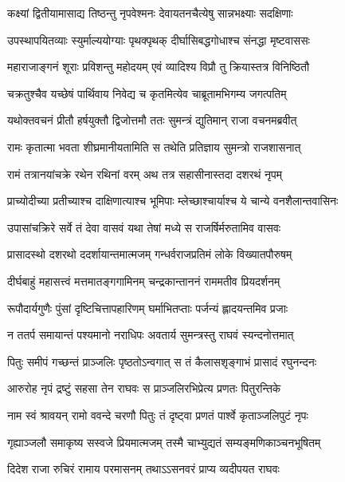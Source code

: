\twolineshloka
{कक्ष्यां द्वितीयामासाद्य तिष्ठन्तु नृपवेश्मनः}
{देवायतनचैत्येषु सान्नभक्ष्याः सदक्षिणाः} %

\twolineshloka
{उपस्थापयितव्याः स्युर्माल्ययोग्याः पृथक्पृथक्}
{दीर्घासिबद्धगोधाश्च संनद्धा मृष्टवाससः} %

\twolineshloka
{महाराजाङ्गनं शूराः प्रविशन्तु महोदयम्}
{एवं व्यादिश्य विप्रौ तु क्रियास्तत्र विनिष्ठितौ} %

\twolineshloka
{चक्रतुश्चैव यच्छेषं पार्थिवाय निवेद्य च}
{कृतमित्येव चाब्रूतामभिगम्य जगत्पतिम्} %

\twolineshloka
{यथोक्तवचनं प्रीतौ हर्षयुक्तौ द्विजोत्तमौ}
{ततः सुमन्त्रं द्युतिमान् राजा वचनमब्रवीत्} %

\twolineshloka
{रामः कृतात्मा भवता शीघ्रमानीयतामिति}
{स तथेति प्रतिज्ञाय सुमन्त्रो राजशासनात्} %

\twolineshloka
{रामं तत्रानयांचक्रे रथेन रथिनां वरम्}
{अथ तत्र सहासीनास्तदा दशरथं नृपम्} %

\twolineshloka
{प्राच्योदीच्या प्रतीच्याश्च दाक्षिणात्याश्च भूमिपाः}
{म्लेच्छाश्चार्याश्च ये चान्ये वनशैलान्तवासिनः} %

\twolineshloka
{उपासांचक्रिरे सर्वे तं देवा वासवं यथा}
{तेषां मध्ये स राजर्षिर्मरुतामिव वासवः} %

\twolineshloka
{प्रासादस्थो दशरथो ददर्शायान्तमात्मजम्}
{गन्धर्वराजप्रतिमं लोके विख्यातपौरुषम्} %

\twolineshloka
{दीर्घबाहुं महासत्त्वं मत्तमातङ्गगामिनम्}
{चन्द्रकान्ताननं राममतीव प्रियदर्शनम्} %

\twolineshloka
{रूपौदार्यगुणैः पुंसां दृष्टिचित्तापहारिणम्}
{घर्माभितप्ताः पर्जन्यं ह्लादयन्तमिव प्रजाः} %

\twolineshloka
{न ततर्प समायान्तं पश्यमानो नराधिपः}
{अवतार्य सुमन्त्रस्तु राघवं स्यन्दनोत्तमात्} %

\twolineshloka
{पितुः समीपं गच्छन्तं प्राञ्जलिः पृष्ठतोऽन्वगात्}
{स तं कैलासशृङ्गाभं प्रासादं रघुनन्दनः} %

\twolineshloka
{आरुरोह नृपं द्रष्टुं सहसा तेन राघवः}
{स प्राञ्जलिरभिप्रेत्य प्रणतः पितुरन्तिके} %

\twolineshloka
{नाम स्वं श्रावयन् रामो ववन्दे चरणौ पितुः}
{तं दृष्ट्वा प्रणतं पार्श्वे कृताञ्जलिपुटं नृपः} %

\twolineshloka
{गृह्याञ्जलौ समाकृष्य सस्वजे प्रियमात्मजम्}
{तस्मै चाभ्युद्यतं सम्यङ्मणिकाञ्चनभूषितम्} %

\twolineshloka
{दिदेश राजा रुचिरं रामाय परमासनम्}
{तथाऽऽसनवरं प्राप्य व्यदीपयत राघवः} %

